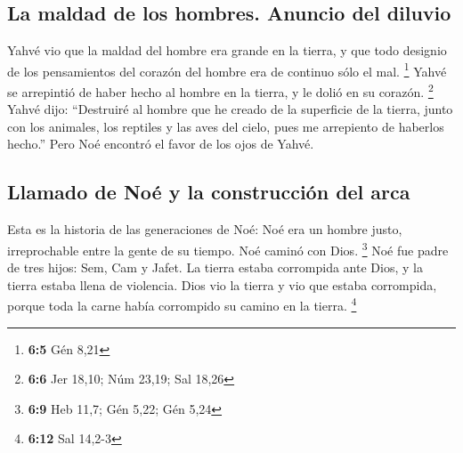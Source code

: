 \begin{paracol}{2}
\hypertarget{la-maldad-de-los-hombres.-anuncio-del-diluvio}{%
\subsection{La maldad de los hombres. Anuncio del
diluvio}\label{la-maldad-de-los-hombres.-anuncio-del-diluvio}}

 Yahvé vio que la maldad del hombre era grande en la
tierra, y que todo designio de los pensamientos del corazón del hombre
era de continuo sólo el mal. \footnote{\textbf{6:5} Gén 8,21}
 Yahvé se arrepintió de haber hecho al hombre en la
tierra, y le dolió en su corazón. \footnote{\textbf{6:6} Jer 18,10; Núm
  23,19; Sal 18,26}  Yahvé dijo: ``Destruiré al hombre que
he creado de la superficie de la tierra, junto con los animales, los
reptiles y las aves del cielo, pues me arrepiento de haberlos hecho.''
 Pero Noé encontró el favor de los ojos de Yahvé.

\hypertarget{llamado-de-nouxe9-y-la-construcciuxf3n-del-arca}{%
\subsection{Llamado de Noé y la construcción del
arca}\label{llamado-de-nouxe9-y-la-construcciuxf3n-del-arca}}

 Esta es la historia de las generaciones de Noé: Noé era
un hombre justo, irreprochable entre la gente de su tiempo. Noé caminó
con Dios. \footnote{\textbf{6:9} Heb 11,7; Gén 5,22; Gén 5,24}
 Noé fue padre de tres hijos: Sem, Cam y Jafet.
 La tierra estaba corrompida ante Dios, y la tierra
estaba llena de violencia.  Dios vio la tierra y vio que
estaba corrompida, porque toda la carne había corrompido su camino en la
tierra. \footnote{\textbf{6:12} Sal 14,2-3}


\end{paracol}
